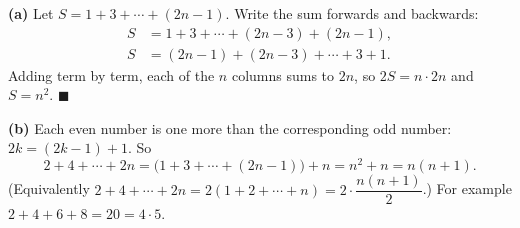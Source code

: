 \textbf{(a)} Let $S=1+3+\cdots+(2n-1)$. Write the sum forwards and backwards:
\begin{align*}
S&=1+3+\cdots+(2n-3)+(2n-1),\\
S&=(2n-1)+(2n-3)+\cdots+3+1.
\end{align*}
Adding term by term, each of the $n$ columns sums to $2n$, so $2S=n\cdot2n$ and $S=\boxed{n^2}$. $\blacksquare$

\textbf{(b)} Each even number is one more than the corresponding odd number: $2k=(2k-1)+1$. So
\[2+4+\cdots+2n=\bigl(1+3+\cdots+(2n-1)\bigr)+n=\boxed{n^2+n=n(n+1)}.\]
(Equivalently $2+4+\cdots+2n=2(1+2+\cdots+n)=2\cdot\dfrac{n(n+1)}{2}$.) For example $2+4+6+8=20=4\cdot5$.

